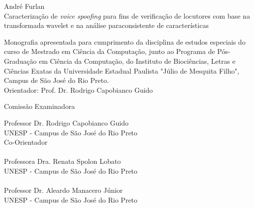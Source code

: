 \documentclass[a4paper,12pt,openright,oneside]{book}
\begin{document}
	\begin{center}
		\vspace{4cm}
		\fontsize{14}{\baselineskip} \selectfont
		\vspace{30.0pt}
		{André Furlan} \\ \vspace{30.0pt}
		{Caracterização de \textit{voice spoofing} para fins de verificação de locutores com base na transformada wavelet e na análise paraconsistente de características} \\ \onehalfspacing \fontsize{14}{\baselineskip} \selectfont
		\par \null
		\begin{flushright}
		\parbox{3.50in}{
			\fontsize{12}{\baselineskip} \selectfont \onehalfspacing
			Monografia apresentada para cumprimento da disciplina de estudos especiais do curso de Mestrado em Ciência da Computação, junto ao Programa de Pós-Graduação em Ciência da Computação, do Instituto de Biociências, Letras e Ciências Exatas da Universidade Estadual Paulista "Júlio de Mesquita Filho", Campus de São José do Rio Preto. \\ \vspace{1.0pt}
			{Orientador: Prof. Dr. Rodrigo Capobianco Guido } \\ \vspace{1.0pt}
		}
		\end{flushright}
		\fontsize{14}{\baselineskip} \selectfont
		Comissão Examinadora \\  \vspace{1.0pt}
	\end{center}

	\fontsize{14}{\baselineskip} \selectfont
	Professor Dr. Rodrigo Capobianco Guido \\ 
	UNESP - Campus de São José do Rio Preto \\
	Co-Orientador \\\\
	
	Professora Dra. Renata Spolon Lobato \\ 
	UNESP - Campus de São José do Rio Preto \\\\
	
	Professor Dr. Aleardo Manacero Júnior \\
	UNESP - Campus de São José do Rio Preto \\\\
	\vspace{3.0cm}
\end{document}
